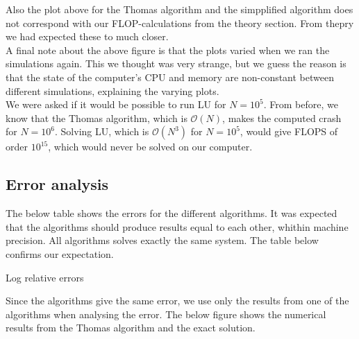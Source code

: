 \documentclass{article}
\begin{document}
Also the plot above for the Thomas algorithm and the simpplified algorithm does not correspond with our FLOP-calculations from the theory section. From thepry we had expected these to much closer.\\

A final note about the above figure is that the plots varied when we ran the simulations again. This we thought was very strange, but we guess the reason is that the state of the computer's CPU and memory are non-constant between different simulations, explaining the varying plots.\\

We were asked if it would be possible to run LU for $N=10^5.$ From before, we know that the Thomas algorithm, which is $\mathcal{O}(N)$, makes the computed crash for $N = 10^6$. Solving LU, which is $\mathcal{O}(N^3)$ for $N = 10^5$, would give FLOPS of order $10^15$, which would never be solved on our computer.

\subsection{Error analysis}
The below table shows the errors for the different algorithms. It was expected that the algorithms should produce results equal to each other, whithin machine precision. All algorithms solves exactly the same system. The table below confirms our expectation. 

\begin{table}[H]
	\begin{minipage}{.32\textwidth} %
		
	\end{minipage}\hfill
	\begin{minipage}{.32\textwidth} %
		
	\end{minipage}\hfill
	\begin{minipage}{.32\textwidth}
		
	\end{minipage}\hfill
	\caption{Log relative errors}
	\label{table: logErrors}
\end{table}

Since the algorithms give the same error, we use only the results from one of the algorithms when analysing the error. The below figure shows the numerical results from the Thomas algorithm and the exact solution.
\end{document}
